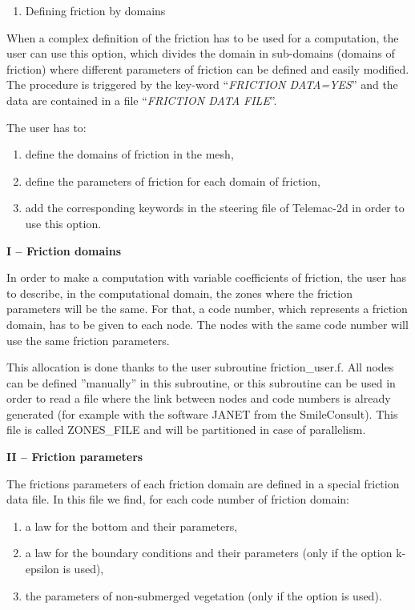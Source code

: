 


\begin{enumerate}
\item   Defining friction by domains
\end{enumerate}

 When a complex definition of the friction has to be used for a computation, the user can use this option, which divides the domain in sub-domains (domains of friction) where different parameters of friction can be defined and easily modified. The procedure is triggered by the key-word ``\textit{FRICTION DATA=YES}'' and the data are contained in a file ``\textit{FRICTION DATA FILE}''.

 The user has to:

\begin{enumerate}
\item  define the domains of friction in the mesh,

\item  define the parameters of friction for each domain of friction,

\item  add the corresponding keywords in the steering file of Telemac-2d in order to use this option.
\end{enumerate}

 \textbf{I -- Friction domains}

 In order to make a computation with variable coefficients of friction, the user has to describe, in the computational domain, the zones where the friction parameters will be the same. For that, a code number, which represents a friction domain, has to be given to each node. The nodes with the same code number will use the same friction parameters.

 This allocation is done thanks to the user subroutine friction\_user.f. All nodes can be defined ''manually'' in this subroutine, or this subroutine can be used in order to read a file where the link between nodes and code numbers is already generated (for example with the software JANET from the SmileConsult). This file is called ZONES\_FILE and will be partitioned in case of parallelism.

 \textbf{II -- Friction parameters}

 The frictions parameters of each friction domain are defined in a special friction data file. In this file we find, for each code number of friction domain:

\begin{enumerate}
\item  a law for the bottom and their parameters,

\item  a law for the boundary conditions and their parameters (only if the option k-epsilon is used),

\item  the parameters of non-submerged vegetation (only if the option is used).
\end{enumerate}

